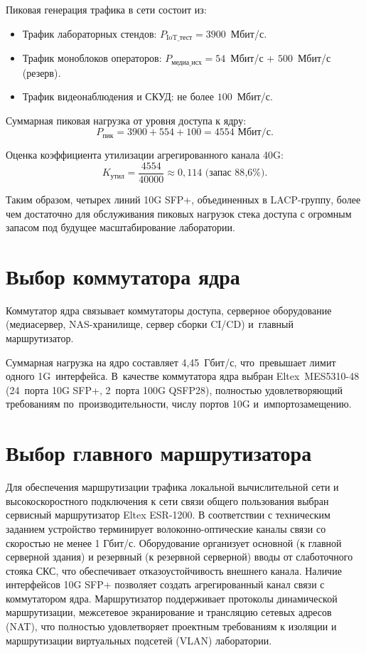 \documentclass{bmstu}
\begin{document}
Пиковая генерация трафика в сети состоит из:
\begin{itemize}
    \item Трафик лабораторных стендов: $P_{\text{IoT\_тест}} = 3900$~Мбит/с.
    \item Трафик моноблоков операторов: $P_{\text{медиа\_исх}} = 54$~Мбит/с + $500$~Мбит/с (резерв).
    \item Трафик видеонаблюдения и СКУД: не более $100$~Мбит/с.
\end{itemize}

Суммарная пиковая нагрузка от уровня доступа к ядру:
\begin{equation}
    P_{\text{пик}} = 3900 + 554 + 100 = 4554 \text{ Мбит/с}.
\end{equation}

Оценка коэффициента утилизации агрегированного канала 40G:
\begin{equation}
    K_{\text{утил}} = \frac{4554}{40000} \approx 0{,}114 \text{ (запас 88{,}6\%)}.
\end{equation}

Таким образом, четырех линий 10G SFP+, объединенных в LACP-группу, более чем достаточно для обслуживания пиковых нагрузок стека доступа с огромным запасом под будущее масштабирование лаборатории.



\section{Выбор коммутатора ядра}

Коммутатор ядра связывает коммутаторы доступа, серверное оборудование (медиасервер, NAS-хранилище, сервер сборки CI/CD) и~главный маршрутизатор.

Суммарная нагрузка на ядро составляет 4,45~Гбит/с, что~превышает лимит одного 1G~интерфейса. В~качестве коммутатора ядра выбран Eltex~MES5310-48 (24~порта 10G SFP+, 2~порта 100G QSFP28), полностью удовлетворяющий требованиям по~производительности, числу портов 10G и~импортозамещению.





\section{Выбор главного маршрутизатора}

Для обеспечения маршрутизации трафика локальной вычислительной сети и высокоскоростного подключения к сети связи общего пользования выбран сервисный маршрутизатор Eltex ESR-1200. В соответствии с техническим заданием устройство терминирует волоконно-оптические каналы связи со скоростью не менее 1 Гбит/с. Оборудование организует основной (к главной серверной здания) и резервный (к резервной серверной) вводы от слаботочного стояка СКС, что обеспечивает отказоустойчивость внешнего канала. Наличие интерфейсов 10G SFP+ позволяет создать агрегированный канал связи с коммутатором ядра. Маршрутизатор поддерживает протоколы динамической маршрутизации, межсетевое экранирование и трансляцию сетевых адресов (NAT), что полностью удовлетворяет проектным требованиям к изоляции и маршрутизации виртуальных подсетей (VLAN) лаборатории. 
\end{document}
